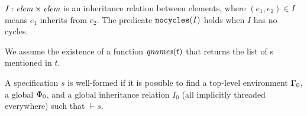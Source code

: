 \documentclass{article}
\begin{document}
$I : \mathit{elem} \times \mathit{elem}$ is an inheritance relation between elements, where $(e_1,e_2) \in I$ means
$e_1$ inherits from $e_2$. The predicate $\texttt{nocycles}({I})$ holds when $I$ has no cycles. 

We assume the existence of a function $\mathit{qnames}({t})$ that returns the list of s mentioned in  $t$.


\newcommand{\validinh}[2]{\texttt{valid-inherit}({#1},{#2})}
\newcommand{\validclient}[2]{\texttt{valid-client}({#1},{#2})}
\newcommand{\validcontains}[2]{\texttt{valid-contains}({#1},{#2})}
\newcommand{\validtop}[1]{\texttt{valid-toplevel}({#1})}

\newcommand{\wb}[3]{{#1} \vdash {#2} \Rightarrow {#3}}
\newcommand{\wbx}[2]{{#1} \vdash {#2}}

A specification $s$ is well-formed if it is possible to find a top-level environment $\Gamma_0$, a global $\Phi_0$,
and a global inheritance relation $I_0$ (all implicitly threaded everywhere) such that $\wbx{}{s}$.
\end{document}
